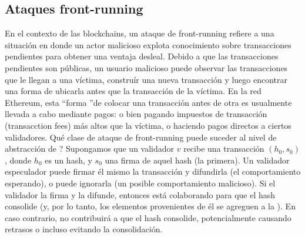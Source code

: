 
\subsection{Ataques front-running}
En el contexto de las blockchains, un ataque de front-running refiere a una situación en donde
un actor malicioso explota conocimiento sobre transacciones pendientes para obtener una ventaja
desleal. Debido a que las transacciones pendientes son públicas, un usuario malicioso puede
observar las transacciones que le llegan a una víctima, construír una nueva transacción y luego
encontrar una forma de ubicarla antes que la transacción de la víctima. En la red Ethereum, esta
\textquotedblleft forma \textquotedblright de colocar una transacción antes de otra es usualmente
llevada a cabo mediante pagos: o bien pagando impuestos de transacción (transacction fees) más altos
que la víctima, o haciendo pagos directos a ciertos validadores.
%
Qué clase de ataque de front-running puede suceder al nivel de abstracción de \hashchain?
Supongamos que un validador $v$ recibe una transacción $(h_0, s_0)$, donde $h_0$ es un hash,
y $s_0$ una firma de aquel hash (la primera). Un validador especulador puede firmar él mismo la
transacción y difundirla (el comportamiento esperando), o puede ignorarla (un posible comportamiento
malicioso). Si el validador la firma y la difunde, entonces está colaborando para que el hash
consolide (y, por lo tanto, los elementos provenientes de él se agreguen a la  \hashchain).
En caso contrario, no contribuirá a que el hash consolide, potencialmente causando retrasos
o incluso evitando la consolidación.
%

